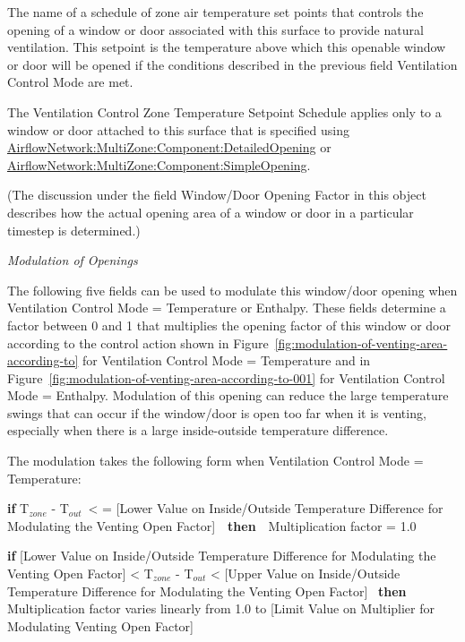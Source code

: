 The name of a schedule of zone air temperature set points that controls the opening of a window or door associated with this surface to provide natural ventilation. This setpoint is the temperature above which this openable window or door will be opened if the conditions described in the previous field Ventilation Control Mode are met.

The Ventilation Control Zone Temperature Setpoint Schedule applies only to a window or door attached to this surface that is specified using \hyperref[airflownetworkmultizonecomponentdetailedopening]{AirflowNetwork:MultiZone:Component:DetailedOpening} or \hyperref[airflownetworkmultizonecomponentsimpleopening]{AirflowNetwork:MultiZone:Component:SimpleOpening}.

(The discussion under the field Window/Door Opening Factor in this object describes how the actual opening area of a window or door in a particular timestep is determined.)

\emph{Modulation of Openings}

The following five fields can be used to modulate this window/door opening when Ventilation Control Mode = Temperature or Enthalpy. These fields determine a factor between 0 and 1 that multiplies the opening factor of this window or door according to the control action shown in Figure~\ref{fig:modulation-of-venting-area-according-to} for Ventilation Control Mode = Temperature and in Figure~\ref{fig:modulation-of-venting-area-according-to-001} for Ventilation Control Mode = Enthalpy. Modulation of this opening can reduce the large temperature swings that can occur if the window/door is open too far when it is venting, especially when there is a large inside-outside temperature difference.

The modulation takes the following form when Ventilation Control Mode = Temperature:

\textbf{if} T\(_{zone}\) - T\(_{out}\)~\textless{} = {[}Lower Value on Inside/Outside Temperature Difference for Modulating the Venting Open Factor{]}~~\textbf{then}~~Multiplication factor = 1.0

\textbf{if} {[}Lower Value on Inside/Outside Temperature Difference for Modulating the Venting Open Factor{]} \textless{} T\(_{zone}\) - T\(_{out}\) \textless{} {[}Upper Value on Inside/Outside Temperature Difference for Modulating the Venting Open Factor{]}~ \textbf{then} Multiplication factor varies linearly from 1.0 to {[}Limit Value on Multiplier for Modulating Venting Open Factor{]}

